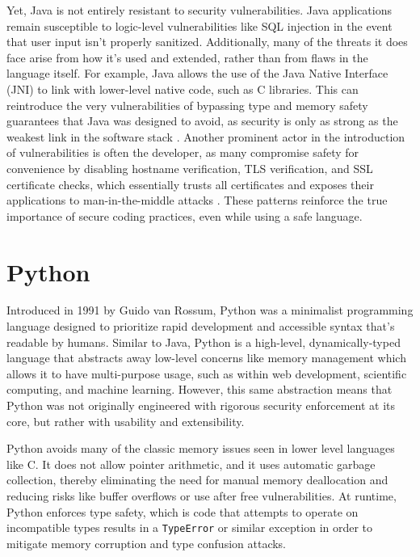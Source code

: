 \documentclass[conference]{IEEEtran}
\begin{document}
Yet, Java is not entirely resistant to security vulnerabilities. Java applications remain susceptible to logic-level vulnerabilities like SQL injection in the event that user input isn't properly sanitized. Additionally, many of the threats it does face arise from how it's used and extended, rather than from flaws in the language itself. For example, Java allows the use of the Java Native Interface (JNI) to link with lower-level native code, such as C libraries. This can reintroduce the very vulnerabilities of bypassing type and memory safety guarantees that Java was designed to avoid, as security is only as strong as the weakest link in the software stack \cite{Shahriar2012}. Another prominent actor in the introduction of vulnerabilities is often the developer, as many compromise safety for convenience by disabling hostname verification, TLS verification, and SSL certificate checks, which essentially trusts all certificates and exposes their applications to man-in-the-middle attacks \cite{Meng2018}. These patterns reinforce the true importance of secure coding practices, even while using a safe language.



\section{Python}

Introduced in 1991 by Guido van Rossum, Python was a minimalist programming language designed to prioritize rapid development and accessible syntax that's readable by humans. Similar to Java, Python is a high-level, dynamically-typed language that abstracts away low-level concerns like memory management which allows it to have multi-purpose usage, such as within web development, scientific computing, and machine learning. However, this same abstraction means that Python was not originally engineered with rigorous security enforcement at its core, but rather with usability and extensibility.

Python avoids many of the classic memory issues seen in lower level languages like C. It does not allow pointer arithmetic, and it uses automatic garbage collection, thereby eliminating the need for manual memory deallocation and reducing risks like buffer overflows or use after free vulnerabilities. At runtime, Python enforces type safety, which is code that attempts to operate on incompatible types results in a \texttt{TypeError} or similar exception in order to mitigate memory corruption and type confusion attacks.
\end{document}
